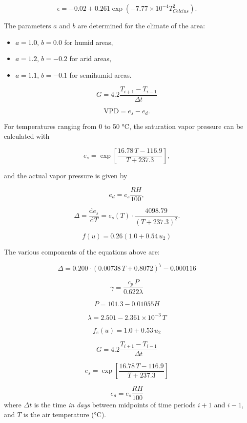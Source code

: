 \documentclass[
  letterpaper,
  DIV=11,
  numbers=noendperiod]{scrreprt}
\providecommand{\tightlist}{%
  \setlength{\itemsep}{0pt}\setlength{\parskip}{0pt}}\usepackage{longtable,booktabs,array}
\begin{document}
\[
\epsilon=-0.02+0.261 \exp\left(-7.77\times10^{-4}T_{Celcius}^2\right).
\]

The parameters \(a\) and \(b\) are determined for the climate of the
area:

\begin{itemize}
\tightlist
\item
  \(a=1.0\), \(b=0.0\) for humid areas,
\item
  \(a=1.2\), \(b=-0.2\) for arid areas,
\item
  \(a=1.1\), \(b=-0.1\) for semihumid areas.
\end{itemize}

\[
G = 4.2\frac{T_{i+1}-T_{i-1}}{\Delta t}
\]

\[
\text{VPD} = e_s - e_d.
\]

For temperatures ranging from 0 to 50 °C, the saturation vapor pressure
can be calculated with

\[
e_s = \exp \left[ \frac{16.78\, T -116.9}{T+237.3} \right],
\]

and the actual vapor pressure is given by

\[
e_d = e_s \frac{RH}{100},
\]

\[
\Delta = \frac{\text{d} e_s}{\text{d}T} = e_s(T)\cdot \frac{4098.79}{(T+237.3)^2}.
\]

\[
f(u) = 0.26(1.0 + 0.54\, u_2)
\]

The various components of the equations above are:

\[
    \Delta = 0.200 \cdot (0.00738\,T + 0.8072)^7 - 0.000116
  \]

\[
    \gamma = \frac{c_p\, P}{0.622 \lambda}
  \]

\[
    P = 101.3-0.01055 H
  \]

\[
    \lambda = 2.501 - 2.361\times 10^{-3}\,T
  \]

\[
    f_e(u) = 1.0 + 0.53\, u_2
  \]

\[
    G = 4.2\frac{T_{i+1}-T_{i-1}}{\Delta t}
  \]

\[
    e_s = \exp \left[ \frac{16.78\, T -116.9}{T+237.3} \right]
  \]

\[
    e_d = e_s \frac{RH}{100}
  \] where \(\Delta t\) is the time \emph{in days} between midpoints of
time periods \(i+1\) and \(i−1\), and \(T\) is the air temperature (°C).
\end{document}
